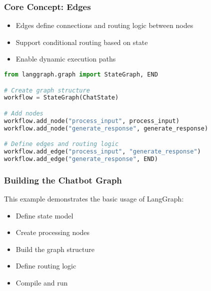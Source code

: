 \begin{frame}[fragile]\frametitle{Core Concept: Edges}

      \begin{itemize}
        \item Edges define connections and routing logic between nodes
        \item Support conditional routing based on state
        \item Enable dynamic execution paths
      \end{itemize}
	  
      \begin{lstlisting}[language=Python, basicstyle=\small]
from langgraph.graph import StateGraph, END

# Create graph structure
workflow = StateGraph(ChatState)

# Add nodes
workflow.add_node("process_input", process_input)
workflow.add_node("generate_response", generate_response)

# Define edges and routing logic
workflow.add_edge("process_input", "generate_response")
workflow.add_edge("generate_response", END)
      \end{lstlisting}

\end{frame}


\begin{frame}[fragile]\frametitle{Building the Chatbot Graph}

This example demonstrates the basic usage of LangGraph:
      \begin{itemize}
        \item Define state model
        \item Create processing nodes
        \item Build the graph structure
        \item Define routing logic
        \item Compile and run
      \end{itemize}
\end{frame}

